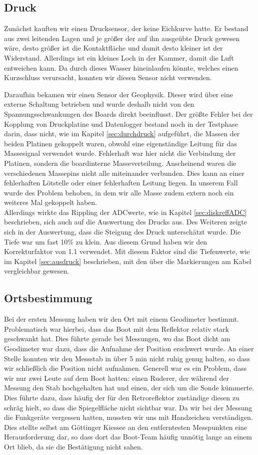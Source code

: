 \documentclass[12pt,a4paper,titlepage,headinclude,bibtotoc]{scrartcl}
\numberwithin{equation}{subsection}
\begin{document}
\subsection{Druck}
Zunächst kauften wir einen Drucksensor, der keine Eichkurve hatte.
Er bestand aus zwei leitenden Lagen und je größer der auf ihn ausgeübte Druck gewesen wäre, desto größer ist die Kontaktfläche und damit desto kleiner ist der Widerstand.
Allerdings ist ein kleines Loch in der Kammer, damit die Luft entweichen kann.
Da durch dieses Wasser hineinlaufen könnte, welches einen Kurzschluss verursacht, konnten wir diesen Sensor nicht verwenden.

Daraufhin bekamen wir einen Sensor der Geophysik.
Dieser wird über eine externe Schaltung betrieben und wurde deshalb nicht von den Spannungsschwankungen des Boards direkt beeinflusst.
Der größte Fehler bei der Kopplung von Druckplatine und Datenlogger bestand noch in der Testphase darin, dass nicht, wie im Kapitel \ref{sec:durchdruck} aufgeführt, die Massen der beiden Platinen gekoppelt waren, obwohl eine eigenständige Leitung für das Massesignal verwendet wurde.
Fehlerhaft war hier nicht die Verbindung der Platinen, sondern die boardinterne Masseverteilung.
Anscheinend waren die verschiedenen Massepins nicht alle miteinander verbunden.
Dies kann an einer fehlerhaften Lötstelle oder einer fehlerhaften Leitung liegen.
In unserem Fall wurde des Problem behoben, in dem wir alle Masse zudem extern noch ein weiteres Mal gekoppelt haben.\\
Allerdings wirkte das Rippling der ADCwerte, wie in Kapitel \ref{sec:diskreffADC} beschrieben, sich auch auf die Auswertung des Drucks aus.
Des Weiteren zeigte sich in der Auswertung, dass die Steigung des Druck unterschätzt wurde.
Die Tiefe war um fast 10\% zu klein.
Aus diesem Grund haben wir den Korrekturfaktor von 1.1 verwendet.
Mit diesem Faktor sind die Tiefenwerte, wie im Kapitel \ref{sec:ausdruck} beschrieben, mit den über die Markierungen am Kabel vergleichbar gewesen.

\subsection{Ortsbestimmung}
Bei der ersten Messung haben wir den Ort mit einem Geodimeter bestimmt.
Problematisch war hierbei, dass das Boot mit dem Reflektor relativ stark geschwankt hat.
Dies führte gerade bei Messungen, wo das Boot dicht am Geodimeter war dazu, dass die Aufnahme der Position erschwert wurde.
An einer Stelle konnten wir den Messstab in über 5 min nicht ruhig genug halten, so dass wir schließlich die Position nicht aufnahmen.
Generell war es ein Problem, dass wir nur zwei Leute auf dem Boot hatten: einen Ruderer, der während der Messung den Stab hochgehalten hat und einen, der sich um die Sonde kümmerte.
Dies führte dazu, dass häufig der für den Retroreflektor zuständige diesen zu schräg hielt, so dass die Spiegelfläche nicht sichtbar war.
Da wir bei der Messung die Funkgeräte vergessen hatten, mussten wir uns mit Handzeichen verständigen.
Dies stellte selbst am Göttinger Kiessee an den entferntesten Messpunkten eine Herausforderung dar, so dass dort das Boot-Team häufig unnötig lange an einem Ort blieb, da sie die Bestätigung nicht sahen.
\end{document}
